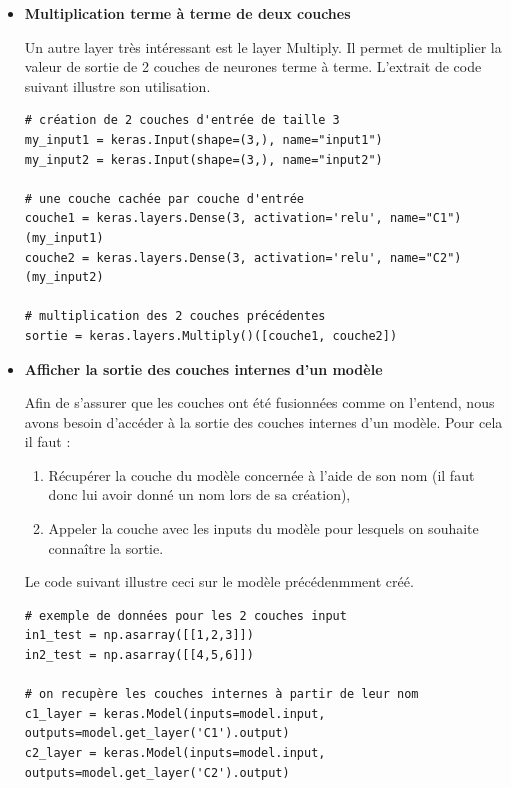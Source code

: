 \begin{itemize}[label=$\square$]
\begin{itemize}

\item	\textbf{Multiplication terme à terme de deux couches}

Un autre layer très intéressant est le layer Multiply. Il permet de multiplier la valeur de sortie de 2 couches de neurones terme à terme. L'extrait de code suivant illustre son utilisation.

\begin{lstlisting}
# création de 2 couches d'entrée de taille 3
my_input1 = keras.Input(shape=(3,), name="input1") 
my_input2 = keras.Input(shape=(3,), name="input2") 

# une couche cachée par couche d'entrée
couche1 = keras.layers.Dense(3, activation='relu', name="C1")(my_input1)
couche2 = keras.layers.Dense(3, activation='relu', name="C2")(my_input2)

# multiplication des 2 couches précédentes 
sortie = keras.layers.Multiply()([couche1, couche2])
\end{lstlisting}
\item \textbf{Afficher la sortie des couches internes d'un modèle}

Afin de s'assurer que les couches ont été fusionnées comme on l'entend, nous avons besoin d'accéder à la sortie des couches internes d'un modèle. Pour cela il faut : 
\begin{enumerate}
\item	Récupérer la couche du modèle concernée à l'aide de son nom (il faut donc lui avoir donné un nom lors de sa création),
\item	Appeler la couche avec les inputs du modèle pour lesquels on souhaite connaître la sortie.
\end{enumerate}
Le code suivant illustre ceci sur le modèle précédenmment créé.

\begin{lstlisting}
# exemple de données pour les 2 couches input
in1_test = np.asarray([[1,2,3]])
in2_test = np.asarray([[4,5,6]])

# on recupère les couches internes à partir de leur nom
c1_layer = keras.Model(inputs=model.input, outputs=model.get_layer('C1').output)
c2_layer = keras.Model(inputs=model.input, outputs=model.get_layer('C2').output)


\end{lstlisting}
\end{itemize}
\end{itemize}
